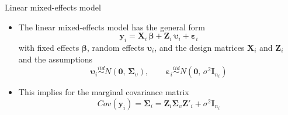 \documentclass[aspectratio=169]{beamer}
\newcommand{\vect}[1]{\mathbf{#1}}
\newcommand{\mat}[1]{\mathbf{#1}}
\newcommand{\gvect}[1]{\boldsymbol{#1}}
\newcommand{\gmat}[1]{\boldsymbol{#1}}
\begin{document}
\begin{frame}{Linear mixed-effects model}
  \begin{itemize}
    \item The linear mixed-effects model has the general form
\[
  \vect{y}_i = \mat{X}_i \, \gvect{\beta} + \mat{Z}_i \, \gvect{\upsilon}_i +
               \gvect{\varepsilon}_i
\]
with fixed effects $\gvect{\beta}$, random effects
$\gvect{\upsilon}_i$, and the design matrices $\mat{X}_i$ and $\mat{Z}_i$
  and the assumptions
\[
  \gvect{\upsilon}_i \overset{iid}{\sim}N(\vect{0}, \, \gmat{\Sigma}_\upsilon),
      \qquad
  \gvect{\varepsilon}_i \overset{iid}{\sim} N(\vect{0}, \, \sigma^2 \mat{I}_{n_i})
\]
\item This implies for the marginal covariance matrix
\[
  Cov(\vect{y}_i) = \gmat{\Sigma}_i =
    \mat{Z}_i \gmat{\Sigma}_\upsilon \mat{Z}'_i + \sigma^2 \mat{I}_{n_i}
\]
  \end{itemize}
\end{frame}
\end{document}
